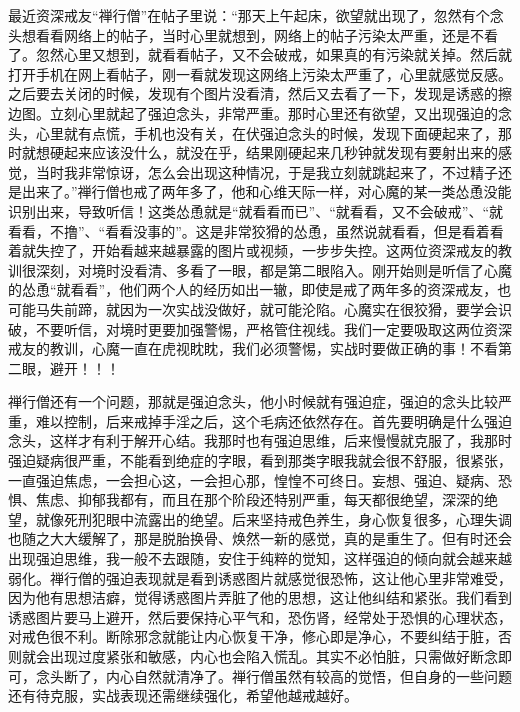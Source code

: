 \begin{case}
    最近资深戒友“禅行僧”在帖子里说：“那天上午起床，欲望就出现了，忽然有个念头想看看网络上的帖子，当时心里就想到，网络上的帖子污染太严重，还是不看了。忽然心里又想到，就看看帖子，又不会破戒，如果真的有污染就关掉。然后就打开手机在网上看帖子，刚一看就发现这网络上污染太严重了，心里就感觉反感。之后要去关闭的时候，发现有个图片没看清，然后又去看了一下，发现是诱惑的擦边图。立刻心里就起了强迫念头，非常严重。那时心里还有欲望，又出现强迫的念头，心里就有点慌，手机也没有关，在伏强迫念头的时候，发现下面硬起来了，那时就想硬起来应该没什么，就没在乎，结果刚硬起来几秒钟就发现有要射出来的感觉，当时我非常惊讶，怎么会出现这种情况，于是我立刻就跳起来了，不过精子还是出来了。”禅行僧也戒了两年多了，他和心维天际一样，对心魔的某一类怂恿没能识别出来，导致听信！这类怂恿就是“就看看而已”、“就看看，又不会破戒”、“就看看，不撸”、“看看没事的”。这是非常狡猾的怂恿，虽然说就看看，但是看着看着就失控了，开始看越来越暴露的图片或视频，一步步失控。这两位资深戒友的教训很深刻，对境时没看清、多看了一眼，都是第二眼陷入。刚开始则是听信了心魔的怂恿“就看看”，他们两个人的经历如出一辙，即使是戒了两年多的资深戒友，也可能马失前蹄，就因为一次实战没做好，就可能沦陷。心魔实在很狡猾，要学会识破，不要听信，对境时更要加强警惕，严格管住视线。我们一定要吸取这两位资深戒友的教训，心魔一直在虎视眈眈，我们必须警惕，实战时要做正确的事！不看第二眼，避开！！！

    禅行僧还有一个问题，那就是强迫念头，他小时候就有强迫症，强迫的念头比较严重，难以控制，后来戒掉手淫之后，这个毛病还依然存在。首先要明确是什么强迫念头，这样才有利于解开心结。我那时也有强迫思维，后来慢慢就克服了，我那时强迫疑病很严重，不能看到绝症的字眼，看到那类字眼我就会很不舒服，很紧张，一直强迫焦虑，一会担心这，一会担心那，惶惶不可终日。妄想、强迫、疑病、恐惧、焦虑、抑郁我都有，而且在那个阶段还特别严重，每天都很绝望，深深的绝望，就像死刑犯眼中流露出的绝望。后来坚持戒色养生，身心恢复很多，心理失调也随之大大缓解了，那是脱胎换骨、焕然一新的感觉，真的是重生了。但有时还会出现强迫思维，我一般不去跟随，安住于纯粹的觉知，这样强迫的倾向就会越来越弱化。禅行僧的强迫表现就是看到诱惑图片就感觉很恐怖，这让他心里非常难受，因为他有思想洁癖，觉得诱惑图片弄脏了他的思想，这让他纠结和紧张。我们看到诱惑图片要马上避开，然后要保持心平气和，恐伤肾，经常处于恐惧的心理状态，对戒色很不利。断除邪念就能让内心恢复干净，修心即是净心，不要纠结于脏，否则就会出现过度紧张和敏感，内心也会陷入慌乱。其实不必怕脏，只需做好断念即可，念头断了，内心自然就清净了。禅行僧虽然有较高的觉悟，但自身的一些问题还有待克服，实战表现还需继续强化，希望他越戒越好。
\end{case}

